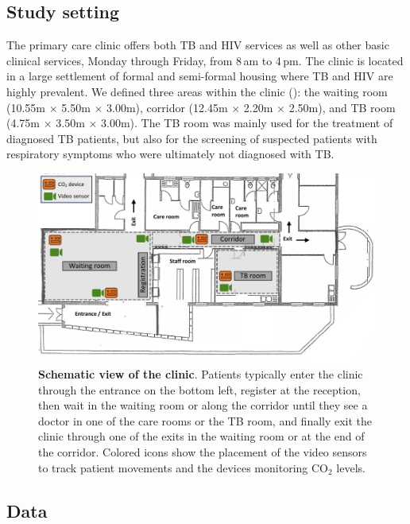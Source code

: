 \documentclass[fleqn,11pt]{wlscirep}
\begin{document}
\subsection{Study setting}

The primary care clinic offers both TB and HIV services as well as other basic clinical services, Monday through Friday, from 8\,am to 4\,pm. The clinic is located in a large settlement of formal and semi-formal housing where TB and HIV are highly prevalent\cite{Wood2007AMJRCCD,Middelkoop2011JAIDS}. We defined three areas within the clinic (): the waiting room (10.55m $\times$ 5.50m $\times$ 3.00m), corridor (12.45m $\times$ 2.20m $\times$ 2.50m), and TB room (4.75m $\times$ 3.50m $\times$ 3.00m). The TB room was mainly used for the treatment of diagnosed TB patients, but also for the screening of suspected patients with respiratory symptoms who were ultimately not diagnosed with TB.

\begin{figure}[!htpb]
    \centering
    \includegraphics{doc/clinic-schematic-annotated-view.pdf}
    \caption{\textbf{Schematic view of the clinic}. Patients typically enter the clinic through the entrance on the bottom left, register at the reception, then wait in the waiting room or along the corridor until they see a doctor in one of the care rooms or the TB room, and finally exit the clinic through one of the exits in the waiting room or at the end of the corridor. Colored icons show the placement of the video sensors to track patient movements and the devices monitoring CO$_2$ levels.}
    \label{fig:floor-plan}
\end{figure}


\subsection{Data}
\end{document}

